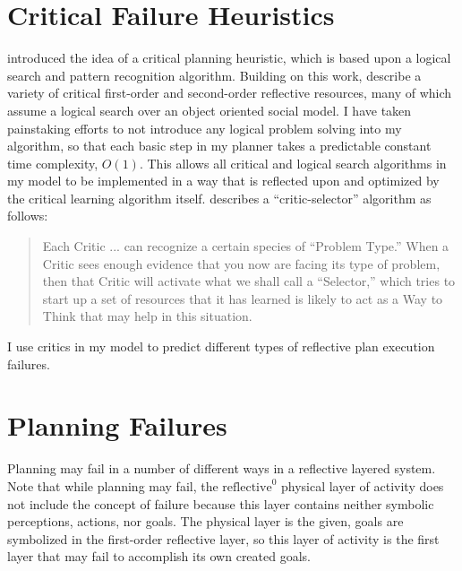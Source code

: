 \section{Critical Failure Heuristics}

\cite{sussman:1973} introduced the idea of a critical planning
heuristic, which is based upon a logical search and pattern
recognition algorithm.  Building on this work, \cite{singh:2003,
  singh:2005a} describe a variety of critical first-order and
second-order reflective resources, many of which assume a logical
search over an object oriented social model.  I have taken painstaking
efforts to not introduce any logical problem solving into my
algorithm, so that each basic step in my planner takes a predictable
constant time complexity, $O(1)$.  This allows all critical and
logical search algorithms in my model to be implemented in a way that
is reflected upon and optimized by the critical learning algorithm
itself.  \cite{minsky:2006} describes a ``critic-selector'' algorithm
as follows:
\begin{quote}
Each Critic ... can recognize a certain species of ``Problem Type.''
When a Critic sees enough evidence that you now are facing its type of
problem, then that Critic will activate what we shall call a
``Selector,'' which tries to start up a set of resources that it has
learned is likely to act as a Way to Think that may help in this
situation.
\end{quote}
I use critics in my model to predict different types of reflective
plan execution failures.

\section{Planning Failures}

Planning may fail in a number of different ways in a reflective
layered system.  Note that while planning may fail, the
$\text{reflective}^0$ physical layer of activity does not include the
concept of failure because this layer contains neither symbolic
perceptions, actions, nor goals.  The physical layer is the given,
goals are symbolized in the first-order reflective layer, so this
layer of activity is the first layer that may fail to accomplish its
own created goals.

